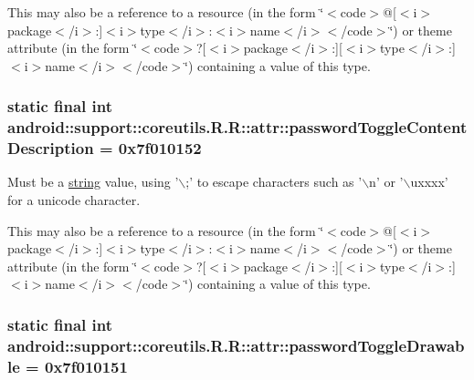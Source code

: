 This may also be a reference to a resource (in the form \char`\"{}$<$code$>$@\mbox{[}$<$i$>$package$<$/i$>$:\mbox{]}$<$i$>$type$<$/i$>$:$<$i$>$name$<$/i$>$$<$/code$>$\char`\"{}) or theme attribute (in the form \char`\"{}$<$code$>$?\mbox{[}$<$i$>$package$<$/i$>$:\mbox{]}\mbox{[}$<$i$>$type$<$/i$>$:\mbox{]}$<$i$>$name$<$/i$>$$<$/code$>$\char`\"{}) containing a value of this type. \hypertarget{classandroid_1_1support_1_1coreutils_1_1_r_1_1attr_4f4298abe0e3e37183cc8a370b2fde6a}{
\subsubsection[{passwordToggleContentDescription}]{\setlength{\rightskip}{0pt plus 5cm}static final int android::support::coreutils.R.R::attr::passwordToggleContentDescription = 0x7f010152}}
\label{classandroid_1_1support_1_1coreutils_1_1_r_1_1attr_4f4298abe0e3e37183cc8a370b2fde6a}


Must be a \hyperlink{classandroid_1_1support_1_1coreutils_1_1_r_1_1string}{string} value, using '$\backslash$;' to escape characters such as '$\backslash$n' or '$\backslash$uxxxx' for a unicode character. 

This may also be a reference to a resource (in the form \char`\"{}$<$code$>$@\mbox{[}$<$i$>$package$<$/i$>$:\mbox{]}$<$i$>$type$<$/i$>$:$<$i$>$name$<$/i$>$$<$/code$>$\char`\"{}) or theme attribute (in the form \char`\"{}$<$code$>$?\mbox{[}$<$i$>$package$<$/i$>$:\mbox{]}\mbox{[}$<$i$>$type$<$/i$>$:\mbox{]}$<$i$>$name$<$/i$>$$<$/code$>$\char`\"{}) containing a value of this type. \hypertarget{classandroid_1_1support_1_1coreutils_1_1_r_1_1attr_6577d39ad59dd3f2aa957d967aa43d56}{
\subsubsection[{passwordToggleDrawable}]{\setlength{\rightskip}{0pt plus 5cm}static final int android::support::coreutils.R.R::attr::passwordToggleDrawable = 0x7f010151}}
\label{classandroid_1_1support_1_1coreutils_1_1_r_1_1attr_6577d39ad59dd3f2aa957d967aa43d56}


